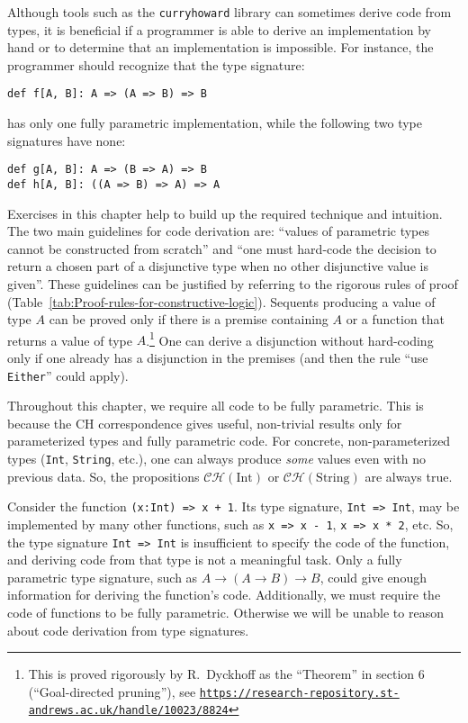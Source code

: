 Although tools such as the \lstinline!curryhoward! library can sometimes
derive code from types, it is beneficial if a programmer is able to
derive an implementation by hand or to determine that an implementation
is impossible. For instance, the programmer should recognize that
the type signature:
\begin{lstlisting}
def f[A, B]: A => (A => B) => B
\end{lstlisting}
has only one fully parametric implementation, while the following
two type signatures have none:
\begin{lstlisting}
def g[A, B]: A => (B => A) => B
def h[A, B]: ((A => B) => A) => A
\end{lstlisting}
Exercises in this chapter help to build up the required technique
and intuition. The two main guidelines for code derivation are: \textsf{``}values
of parametric types cannot be constructed from scratch\textsf{''} and \textsf{``}one
must hard-code the decision to return a chosen part of a disjunctive
type when no other disjunctive value is given\textsf{''}. These guidelines
can be justified by referring to the rigorous rules of proof (Table~\ref{tab:Proof-rules-for-constructive-logic}).
Sequents producing a value of type $A$ can be proved only if there
is a premise containing $A$ or a function that returns a value of
type $A$.\footnote{This is proved rigorously by R.~Dyckhoff as
the \textsf{``}Theorem\textsf{''} in section 6 (\textsf{``}Goal-directed pruning\textsf{''}), see
\texttt{\href{https://research-repository.st-andrews.ac.uk/handle/10023/8824}{https://research-repository.st-andrews.ac.uk/handle/10023/8824}}} One can derive a disjunction without hard-coding only if one already
has a disjunction in the premises (and then the rule \textsf{``}use \lstinline!Either!\textsf{''}
could apply).

Throughout this chapter, we require all code to be fully parametric.
This is because the CH correspondence gives useful, non-trivial results
only for parameterized types and fully parametric code. For concrete,
non-parameterized types (\lstinline!Int!, \lstinline!String!, etc.),
one can always produce \emph{some} values even with no previous data.
So, the propositions $\mathcal{CH}(\text{Int})$ or $\mathcal{CH}(\text{String})$
are always true.

Consider the function \lstinline!(x:Int) => x + 1!. Its type signature,
\lstinline!Int => Int!, may be implemented by many other functions,
such as \lstinline!x => x - 1!, \lstinline!x => x * 2!, etc. So,
the type signature \lstinline!Int => Int! is insufficient to specify
the code of the function, and deriving code from that type is not
a meaningful task. Only a fully parametric type signature, such as
$A\rightarrow\left(A\rightarrow B\right)\rightarrow B$, could give
enough information for deriving the function\textsf{'}s code. Additionally,
we must require the code of functions to be fully parametric. Otherwise
we will be unable to reason about code derivation from type signatures.

